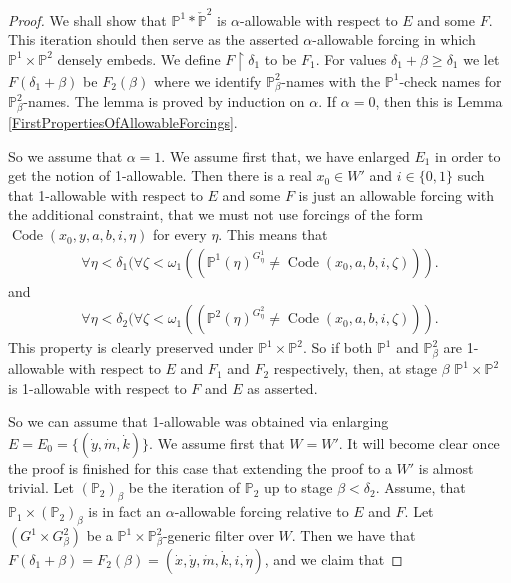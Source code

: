 \documentclass[a4paper,11pt]{article}
\newcommand{\forceP}{\mathbb{P}}
\begin{document}
\begin{proof}
We shall show that $\forceP^1 \ast \check{\forceP}^2$ is $\alpha$-allowable with respect to $E$ and some $F$. This iteration should then serve as the asserted $\alpha$-allowable forcing in which $\forceP^1 \times \forceP^2$ densely embeds. 
We define $F \upharpoonright \delta_1$ to be $F_1$. For values $\delta_1+ \beta  \ge \delta_1$ we let $F(\delta_1+\beta)$ be $F_2(\beta)$ where we identify $\forceP^2_{\beta}$-names with the $\forceP^1$-check names for $\forceP^2_{\beta}$-names. The lemma is proved by induction on $\alpha$. If $\alpha=0$, then this is Lemma \ref{FirstPropertiesOfAllowableForcings}. 

So we assume that $\alpha=1$. We assume first that, we have enlarged $E_1$ in order to get the notion of 1-allowable. Then there is a real $x_0 \in W'$ and $i \in \{0,1\}$ such that 1-allowable with respect to $E$ and some $F$ is just an allowable forcing with the additional constraint, that we must not use forcings of the form $\operatorname{Code} (x_0,y,a,b,i, \eta)$ for every $\eta$. This means that
    \begin{align*}
        \forall \eta < \delta_1 ( \forall \zeta < \omega_1 (( \mathbb{P}^1(\eta)^{G^1_{\eta}} \neq \operatorname{Code}(x_0, a, b, i, \zeta) )).
    \end{align*}
    and
    \begin{align*}
        \forall \eta < \delta_2 ( \forall \zeta < \omega_1 (( \mathbb{P}^2(\eta)^{G^2_{\eta}} \neq \operatorname{Code}(x_0, a, b, i, \zeta) )).
    \end{align*}
    This property is clearly preserved under $\forceP^1 \times \forceP^2$.
    So if both $\forceP^1$ and $\forceP^2_{\beta}$ are 1-allowable with respect to $E $ and $F_1$ and $F_2$ respectively, then, at stage $\beta$ $\forceP^1 \times \forceP^2$ is 1-allowable with respect to $F$ and $E$ as asserted.


So we can assume that 1-allowable was obtained via enlarging $E=E_0= \{(\dot{y},\dot{m},\dot{k})\}$. 
We assume first that $W= W'$. It will become clear once the proof is finished for this case that extending the proof to a $W'$ is almost trivial.
Let $(\forceP_2)_{\beta}$ be the iteration of $\forceP_2$ up to stage $\beta < \delta_2$. Assume, that $\forceP_1 \times (\forceP_2)_{\beta}$ is in fact an $\alpha$-allowable forcing relative to $E$ and $F$. Let $(G^1 \times G^2_{\beta})$ be a $\forceP^1 \times \forceP^2_{\beta}$-generic filter over $W$.  Then we have that $F(\delta_1+\beta) =F_2(\beta)  =(\dot{x},\dot{y},\dot{m},\dot{k} ,i,\dot{\eta})$, and we claim that


\end{proof}
\end{document}

